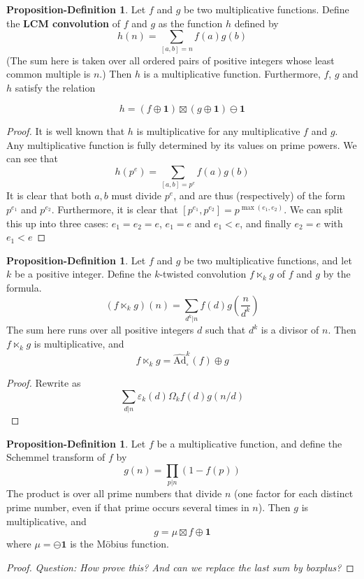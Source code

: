 \documentclass[a4paper]{article}
\theoremstyle{definition}
\newtheorem{propdef}[theorem]{Proposition-Definition}
\theoremstyle{remark}
\newcommand{\one}{\mathbf{1}}
\newcommand{\hatboxadam}[1]{\widehat{\text{Ad}}^{#1}_{\square}}
\newcommand{\ktwist}[1]{\hspace{1pt} \ltimes_{#1} \hspace{1pt} }
\newcommand{\defhl}[1]{\textbf{#1}}
\begin{document}
\begin{propdef}
Let $f$ and $g$ be two multiplicative functions. Define the \defhl{LCM convolution} of $f$ and $g$ as the function $h$ defined by
$$ h(n) = \sum_{[a,b] = n} f(a) g(b)   $$
(The sum here is taken over all ordered pairs of positive integers whose least common multiple is $n$.) Then $h$ is a multiplicative function. Furthermore, $f$, $g$ and $h$ satisfy the relation

$$  h = (f \oplus \one) \boxtimes (g \oplus \one) \ominus \one   $$

\end{propdef}

\begin{proof}
It is well known that $h$ is multiplicative for any multiplicative $f$ and $g$. Any multiplicative function is fully determined by its values on prime powers. We can see that
$$h(p^e) = \sum_{[a, b] = p^e} f(a)g(b)$$
It is clear that both $a, b$ must divide $p^e$, and are thus (respectively) of the form $p^{e_1}$ and $p^{e_2}$. Furthermore, it is clear that $[p^{e_1}, p^{e_2}] = p^{\max(e_1, e_2)}$. We can split this up into three cases: $e_1 = e_2 = e$, $e_1 = e$ and $e_1 < e$, and finally $e_2 = e$ with $e_1 < e$
\end{proof}


\begin{propdef}
Let $f$ and $g$ be two multiplicative functions, and let $k$ be a positive integer. Define the $k$-twisted convolution $f \ktwist{k} g$  of $f$ and $g$ by the formula.
$$  (f \ktwist{k} g) (n) = \sum_{d^k \vert n} f(d) g(\frac{n}{d^k})   $$
The sum here runs over all positive integers $d$ such that $d^k$ is a divisor of $n$. Then $f \ktwist{k} g$ is multiplicative, and 
$$  f \ktwist{k} g =  \hatboxadam{k}(f) \oplus g  $$
\end{propdef}
\begin{proof}
Rewrite as 
$$  \sum_{d \vert n} \varepsilon_k(d) \Omega_k f(d) g(n/d)  $$
\end{proof}

\begin{propdef}
Let $f$ be a multiplicative function, and define the Schemmel transform of $f$ by
$$ g(n) = \prod_{p \vert n} (1-f(p))   $$
The product is over all prime numbers that divide $n$ (one factor for each distinct prime number, even if that prime occurs several times in $n$). Then $g$ is multiplicative, and 
$$  g = \mu \boxtimes f \oplus \mathbf{1}    $$
where $\mu = \ominus \mathbf{1}$ is the M{\"o}bius function.
\end{propdef}
\begin{proof}
\emph{Question: How prove this? And can we replace the last sum by boxplus?}
\end{proof}
\end{document}
